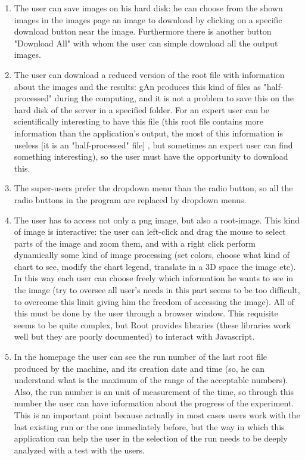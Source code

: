 \begin{enumerate}
\item The user can save images on his hard disk: he can choose from the shown images in the images page an image to download by clicking on a specific download button near the image. Furthermore there is another button "Download All" with whom the user can simple download all the output images.

\item The user can download a reduced version of the root file with information about the images and the results: gAn produces this kind of files as "half-processed" during the computing, and it is not a problem to save this on the hard disk of the server in a specified folder. For an expert user can be scientifically interesting to have this file (this root file contains more information than the application's output, the most of this information is useless [it is an "half-processed" file] , but sometimes an expert user can find something interesting), so the user must have the opportunity to download this.     

\item The super-users prefer the dropdown menu than the radio button, so all the radio buttons in the program are replaced by dropdown menus.

\item The user has to access not only a png image, but also a root-image. This kind of image is interactive: the user can left-click and drag the mouse to select parts of the image and zoom them, and with a right click perform dynamically some kind of image processing (set colors, choose what kind of chart to see, modify the chart legend, translate in a 3D space the image etc). In this way each user can choose freely which information he wants to see in the image (try to oversee all user's needs in this part seems to be too difficult, to overcome this limit giving him the freedom of accessing the image).
All of this must be done by the user through a browser window. This requisite seems to be quite complex, but Root provides libraries (these libraries work well but they are poorly documented) to interact with Javascript.

\item In the homepage the user can see the run number of the last root file produced by the machine, and its creation date and time (so, he can understand what is the maximum of the range of the acceptable numbers). Also, the run number is an unit of measurement of the time, so through this number the user can have information about the progress of the experiment. This is an important point because actually in most cases users work with the last existing run or the one immediately before, but the way in which this application can help the user in the selection of the run needs to be deeply analyzed with a test with the users. 


\end{enumerate}
